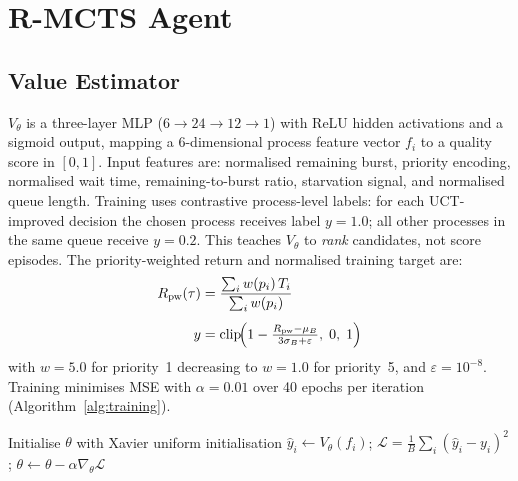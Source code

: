 \documentclass[10pt,journal,compsoc]{IEEEtran}
\begin{document}
\section{R-MCTS Agent}
\label{sec:agent}

\subsection{Value Estimator}

$V_\theta$ is a three-layer MLP ($6{\to}24{\to}12{\to}1$) with ReLU
hidden activations and a sigmoid output, mapping a 6-dimensional process
feature vector $f_i$ to a quality score in $[0,1]$.
Input features are: normalised remaining burst, priority encoding,
normalised wait time, remaining-to-burst ratio, starvation signal, and
normalised queue length.
Training uses contrastive process-level labels: for each UCT-improved
decision the chosen process receives label $y{=}1.0$; all other processes
in the same queue receive $y{=}0.2$.
This teaches $V_\theta$ to \emph{rank} candidates, not score episodes.
The priority-weighted return and normalised training target are:
\begin{align}
  R_{\text{pw}}(\tau) &= \frac{\sum_i w(p_i)\,T_i}{\sum_i w(p_i)}
  \label{eq:rpw}\\[4pt]
  y &= \operatorname{clip}\!\Bigl(
    1 - \tfrac{R_{\text{pw}} - \mu_B}{3\sigma_B + \varepsilon},\;0,\;1
  \Bigr)
  \label{eq:target}
\end{align}
with $w\!=\!5.0$ for priority~1 decreasing to $w\!=\!1.0$ for
priority~5, and $\varepsilon\!=\!10^{-8}$.
Training minimises MSE with $\alpha\!=\!0.01$ over 40 epochs per
iteration (Algorithm~\ref{alg:training}).

\begin{algorithm}[!t]
\caption{Value Estimator Training (Contrastive)}
\label{alg:training}
\begin{algorithmic}[1]
\State Initialise $\theta$ with Xavier uniform initialisation
    \State $\hat{y}_i \leftarrow V_\theta(f_i)$;\;
           $\mathcal{L} = \frac{1}{B}\sum_i(\hat{y}_i-y_i)^2$;\;
           $\theta \leftarrow \theta - \alpha\nabla_\theta\mathcal{L}$
  \EndFor
\EndFor
\end{algorithmic}
\end{algorithm}
\end{document}
